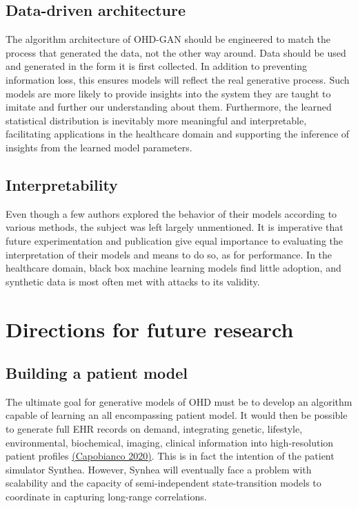 \documentclass[10pt]{article}
\begin{document}
\subsection{Data-driven architecture}\label{sec:archi}
The algorithm architecture of OHD-GAN should be engineered to match the process that generated the data, not the other way around. Data should be used and generated in the form it is first collected. In addition to preventing information loss, this ensures models will reflect the real generative process. Such models are more likely to provide insights into the system they are taught to imitate and further our understanding about them. Furthermore, the learned statistical distribution is inevitably more meaningful and interpretable, facilitating applications in the healthcare domain and supporting the inference of insights from the learned model parameters.
\subsection{Interpretability}
Even though a few authors explored the behavior of their models according to various methods, the subject was left largely unmentioned. It is imperative that future experimentation and publication give equal importance to evaluating the interpretation of their models and means to do so, as for performance. In the healthcare domain, black box machine learning models find little adoption, and synthetic data is most often met with attacks to its validity.

\section{Directions for future research}
\subsection{Building a patient model}
The ultimate goal for generative models of OHD must be to develop an algorithm capable of learning an all encompassing patient model. It would then be possible to generate full EHR records on demand, integrating genetic, lifestyle, environmental, biochemical, imaging, clinical information into high-resolution patient profiles \hyperref[csl:65]{(Capobianco 2020)}. This is in fact the intention of the patient simulator Synthea. However, Synhea will eventually face a problem with scalability and the capacity of semi-independent state-transition models to coordinate in capturing long-range correlations.\par
\end{document}
